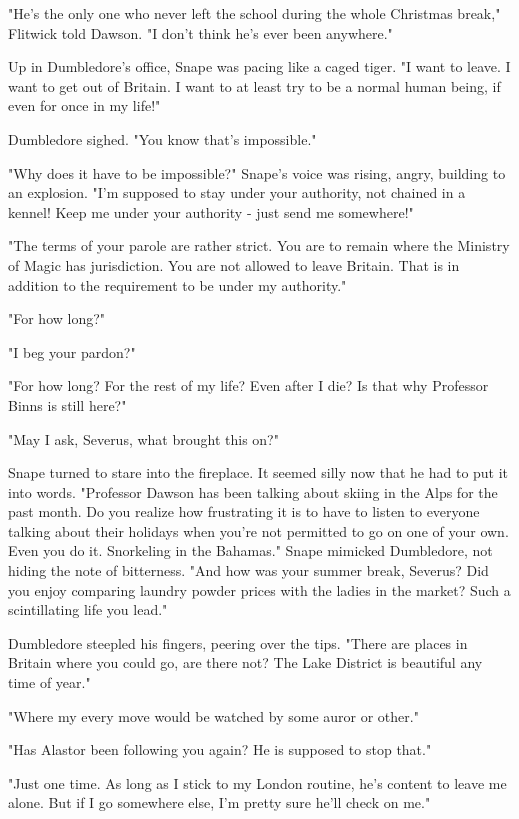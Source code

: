 "He's the only one who never left the school during the whole Christmas break," Flitwick told Dawson. "I don't think he's ever been anywhere."

Up in Dumbledore's office, Snape was pacing like a caged tiger. "I want to leave. I want to get out of Britain. I want to at least try to be a normal human being, if even for once in my life!"

Dumbledore sighed. "You know that's impossible."

"Why does it have to be impossible?" Snape's voice was rising, angry, building to an explosion. "I'm supposed to stay under your authority, not chained in a kennel! Keep me under your authority - just send me somewhere!"

"The terms of your parole are rather strict. You are to remain where the Ministry of Magic has jurisdiction. You are not allowed to leave Britain. That is in addition to the requirement to be under my authority."

"For how long?"

"I beg your pardon?"

"For how long? For the rest of my life? Even after I die? Is that why Professor Binns is still here?"

"May I ask, Severus, what brought this on?"

Snape turned to stare into the fireplace. It seemed silly now that he had to put it into words. "Professor Dawson has been talking about skiing in the Alps for the past month. Do you realize how frustrating it is to have to listen to everyone talking about their holidays when you're not permitted to go on one of your own. Even you do it. Snorkeling in the Bahamas." Snape mimicked Dumbledore, not hiding the note of bitterness. "And how was your summer break, Severus? Did you enjoy comparing laundry powder prices with the ladies in the market? Such a scintillating life you lead."

Dumbledore steepled his fingers, peering over the tips. "There are places in Britain where you could go, are there not? The Lake District is beautiful any time of year."

"Where my every move would be watched by some auror or other."

"Has Alastor been following you again? He is supposed to stop that."

"Just one time. As long as I stick to my London routine, he's content to leave me alone. But if I go somewhere else, I'm pretty sure he'll check on me."

